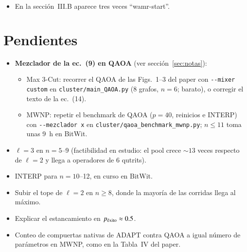 \documentclass[11pt,a4paper]{article}
\newcommand{\pex}{p_{\rm \acute{e}xito}}
\begin{document}
\begin{itemize}
\begin{enumerate}
    \texttt{resultados\_qaoa\_regulares\_n6\_p20\_jx\_r25\_grafos\_1\_4.json}, llevan \texttt{jx} en el
    nombre, y sus 80 registros tienen \texttt{"mixer": "jx"}. El Apéndice~B (compilación de QAOA,
    Tabla~IV) sí dice $H_M=\sum_jL_x^{(j)}$, que es lo que se corrió.
  \end{enumerate}
  Hay dos formas de arreglarlo: corregir el texto de la ec.~(14) para que diga $\sum_jL_x^{(j)}$, o
  recorrer el QAOA de Max 3-Cut con \texttt{-{}-mixer custom} para que las figuras correspondan a la
  ec.~(9). La segunda es barata (8 grafos de $n=6$) y además responde si QAOA mejora con el
  mezclador ``correcto''. El QAOA de MWNP de este informe usa $\sum_jL_x^{(j)}$ para ser
  consistente con lo publicado, así que le aplica lo mismo.
\item En la sección~III.B aparece tres veces ``wamr-start''.
\end{itemize}

\section{Pendientes}

\begin{itemize}
\item \textbf{Mezclador de la ec.~(9) en QAOA} (ver sección~\ref{sec:notas}):
  \begin{itemize}
  \item Max 3-Cut: recorrer el QAOA de las Figs.~1--3 del paper con \texttt{-{}-mixer custom} en
    \texttt{cluster/main\_QAOA.py} (8 grafos, $n=6$; barato), o corregir el texto de la ec.~(14).
  \item MWNP: repetir el benchmark de QAOA ($p=40$, reinicios e INTERP) con
    \texttt{-{}-mezclador x} en \texttt{cluster/qaoa\_benchmark\_mwnp.py}; $n\leq11$ toma unas 9~h en
    BitWit.
  \end{itemize}
\item $\ell=3$ en $n=5$--9 (factibilidad en estudio: el pool crece $\sim13$ veces respecto de
  $\ell=2$ y llega a operadores de 6 qutrits).
\item INTERP para $n=10$--12, en curso en BitWit.
\item Subir el tope de $\ell=2$ en $n\geq8$, donde la mayoría de las corridas llega al máximo.
\item Explicar el estancamiento en $\pex\approx0.5$.
\item Conteo de compuertas nativas de ADAPT contra QAOA a igual número de parámetros en MWNP, como
  en la Tabla~IV del paper.
\end{itemize}
\end{document}
